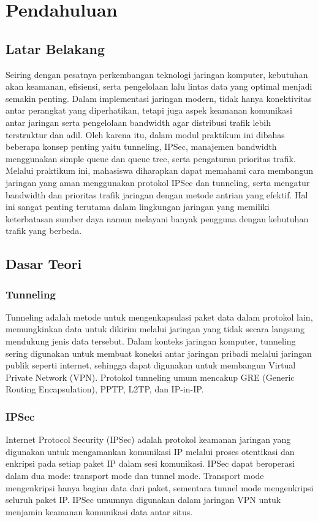 \section{Pendahuluan}
\subsection*{Latar Belakang}

Seiring dengan pesatnya perkembangan teknologi jaringan komputer, kebutuhan akan keamanan, efisiensi, serta pengelolaan lalu lintas data yang optimal menjadi semakin penting. Dalam implementasi jaringan modern, tidak hanya konektivitas antar perangkat yang diperhatikan, tetapi juga aspek keamanan komunikasi antar jaringan serta pengelolaan bandwidth agar distribusi trafik lebih terstruktur dan adil. Oleh karena itu, dalam modul praktikum ini dibahas beberapa konsep penting yaitu tunneling, IPSec, manajemen bandwidth menggunakan simple queue dan queue tree, serta pengaturan prioritas trafik. Melalui praktikum ini, mahasiswa diharapkan dapat memahami cara membangun jaringan yang aman menggunakan protokol IPSec dan tunneling, serta mengatur bandwidth dan prioritas trafik jaringan dengan metode antrian yang efektif. Hal ini sangat penting terutama dalam lingkungan jaringan yang memiliki keterbatasan sumber daya namun melayani banyak pengguna dengan kebutuhan trafik yang berbeda.


\subsection*{Dasar Teori}

\subsubsection{Tunneling}
Tunneling adalah metode untuk mengenkapsulasi paket data dalam protokol lain, memungkinkan data untuk dikirim melalui jaringan yang tidak secara langsung mendukung jenis data tersebut. Dalam konteks jaringan komputer, tunneling sering digunakan untuk membuat koneksi antar jaringan pribadi melalui jaringan publik seperti internet, sehingga dapat digunakan untuk membangun Virtual Private Network (VPN). Protokol tunneling umum mencakup GRE (Generic Routing Encapsulation), PPTP, L2TP, dan IP-in-IP.

\subsubsection{IPSec}
Internet Protocol Security (IPSec) adalah protokol keamanan jaringan yang digunakan untuk mengamankan komunikasi IP melalui proses otentikasi dan enkripsi pada setiap paket IP dalam sesi komunikasi. IPSec dapat beroperasi dalam dua mode: transport mode dan tunnel mode. Transport mode mengenkripsi hanya bagian data dari paket, sementara tunnel mode mengenkripsi seluruh paket IP. IPSec umumnya digunakan dalam jaringan VPN untuk menjamin keamanan komunikasi data antar situs.

